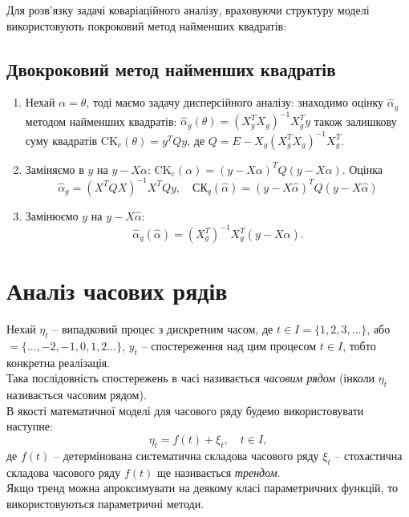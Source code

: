 Для розв’язку задачі коваріаційного аналізу, враховуючи структуру моделі використовують покроковий метод найменших квадратів:

\subsection{Двокроковий метод найменших квадратів}

\begin{enumerate}
	\item Нехай $\alpha = \theta$, тоді маємо задачу дисперсійного аналізу: знаходимо оцінку $\widehat{\alpha}_g$ методом найменших квадратів: $\widehat{\alpha}_g(\theta)=(X_g^TX_g)^{-1}X_g^Ty$ також залишкову суму квадратів $\text{CK}_e(\theta)=y^TQy$, де $Q=E-X_g(X_g^TX_g)^{-1}X_g^T$.
	
	\item Заміняємо в $y$ на $y-X\alpha$: $\text{CK}_e(\alpha)=(y-X\alpha)^TQ(y-X\alpha)$. Оцінка \[ \widehat{\alpha}_g = (X^TQX)^{-1}X^TQy, \quad \text{СК}_q(\widehat{\alpha})=(y-X\widehat{\alpha})^TQ(y-X\widehat{\alpha}) \]

	\item Замінюємо $y$ на $y-X\widehat{\alpha}$: \[ \widehat{\alpha}_g(\widehat{\alpha}) = (X_g^T)^{-1}X_g^T(y-X\widehat{\alpha}). \]
\end{enumerate}

\section{Аналіз часових рядів}

Нехай $\eta_t$ -- випадковий процес з дискретним часом, де $t\in I=\{1,2,3,\ldots\}$, або $=\{\ldots,-2,-1,0,1,2\ldots\}$, $y_t$ -- спостереження над цим процесом $t\in I$, тобто конкретна реалізація. \\

Така послідовність спостережень в часі називається \textit{часовим рядом} (інколи $\eta_t$ називається часовим рядом). \\

В якості математичної моделі для часового ряду будемо використовувати наступне: \[ \eta_t = f(t) + \xi_t, \quad t \in I, \] де $f(t)$ -- детермінована систематична складова часового ряду $\xi_t$ -- стохастична складова часового ряду $f(t)$ ще називається \textit{трендом}. \\

Якщо тренд можна апроксимувати на деякому класі параметричних функцій, то використовуються параметричні методи. \\

